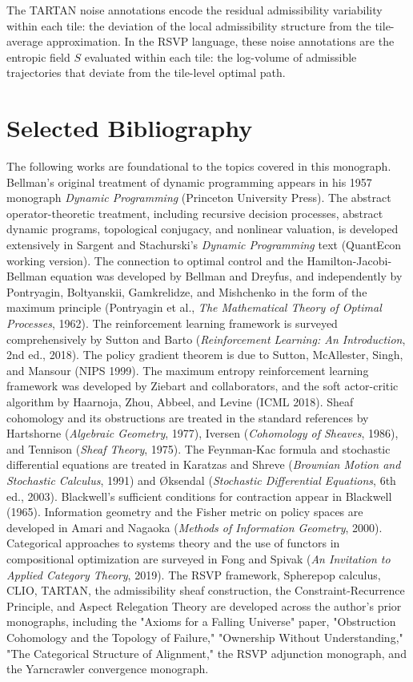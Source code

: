 \documentclass[12pt, a4paper, openany]{book}
\theoremstyle{plain}
\theoremstyle{definition}
\theoremstyle{remark}
\newcommand{\Sfield}{S}
\begin{document}
The TARTAN noise annotations encode the residual admissibility variability within each tile: the deviation of the local admissibility structure from the tile-average approximation. In the RSVP language, these noise annotations are the entropic field $\Sfield$ evaluated within each tile: the log-volume of admissible trajectories that deviate from the tile-level optimal path.

\chapter{Selected Bibliography}

The following works are foundational to the topics covered in this monograph. Bellman's original treatment of dynamic programming appears in his 1957 monograph \textit{Dynamic Programming} (Princeton University Press). The abstract operator-theoretic treatment, including recursive decision processes, abstract dynamic programs, topological conjugacy, and nonlinear valuation, is developed extensively in Sargent and Stachurski's \textit{Dynamic Programming} text (QuantEcon working version). The connection to optimal control and the Hamilton-Jacobi-Bellman equation was developed by Bellman and Dreyfus, and independently by Pontryagin, Boltyanskii, Gamkrelidze, and Mishchenko in the form of the maximum principle (Pontryagin et al., \textit{The Mathematical Theory of Optimal Processes}, 1962). The reinforcement learning framework is surveyed comprehensively by Sutton and Barto (\textit{Reinforcement Learning: An Introduction}, 2nd ed., 2018). The policy gradient theorem is due to Sutton, McAllester, Singh, and Mansour (NIPS 1999). The maximum entropy reinforcement learning framework was developed by Ziebart and collaborators, and the soft actor-critic algorithm by Haarnoja, Zhou, Abbeel, and Levine (ICML 2018). Sheaf cohomology and its obstructions are treated in the standard references by Hartshorne (\textit{Algebraic Geometry}, 1977), Iversen (\textit{Cohomology of Sheaves}, 1986), and Tennison (\textit{Sheaf Theory}, 1975). The Feynman-Kac formula and stochastic differential equations are treated in Karatzas and Shreve (\textit{Brownian Motion and Stochastic Calculus}, 1991) and Øksendal (\textit{Stochastic Differential Equations}, 6th ed., 2003). Blackwell's sufficient conditions for contraction appear in Blackwell (1965). Information geometry and the Fisher metric on policy spaces are developed in Amari and Nagaoka (\textit{Methods of Information Geometry}, 2000). Categorical approaches to systems theory and the use of functors in compositional optimization are surveyed in Fong and Spivak (\textit{An Invitation to Applied Category Theory}, 2019). The RSVP framework, Spherepop calculus, CLIO, TARTAN, the admissibility sheaf construction, the Constraint-Recurrence Principle, and Aspect Relegation Theory are developed across the author's prior monographs, including the "Axioms for a Falling Universe" paper, "Obstruction Cohomology and the Topology of Failure," "Ownership Without Understanding," "The Categorical Structure of Alignment," the RSVP adjunction monograph, and the Yarncrawler convergence monograph.
\end{document}

